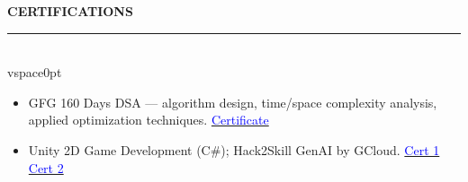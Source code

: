 \documentclass[10pt,letterpaper]{article}
\begin{document}
\noindent\textbf{CERTIFICATIONS}\\[-5pt]
\rule{\textwidth}{0.4pt}\\vspace{0pt}
\begin{itemize}[leftmargin=10pt,itemsep=0pt,parsep=0pt,topsep=0pt]
    \item GFG 160 Days DSA --- algorithm design, time/space complexity analysis, applied optimization techniques. \hfill\href{https://drive.google.com/file/d/1xmtbhxbkJqVnqIyEJBFWzye9Y6arBSWH/view?usp=sharing}{\textcolor{blue}{Certificate}}
    \item Unity 2D Game Development (C\#); Hack2Skill GenAI by GCloud. \hfill\href{https://drive.google.com/file/d/1WYLKom4Tddycur4ToRH6gwuLzwIIPZE_/view?usp=sharing}{\textcolor{blue}{Cert 1}} \hspace{5pt} \href{https://drive.google.com/file/d/1sD_wew3UzORZ7dlxQiRjjk/view?usp=sharing}{\textcolor{blue}{Cert 2}}
\end{itemize}
\end{document}
